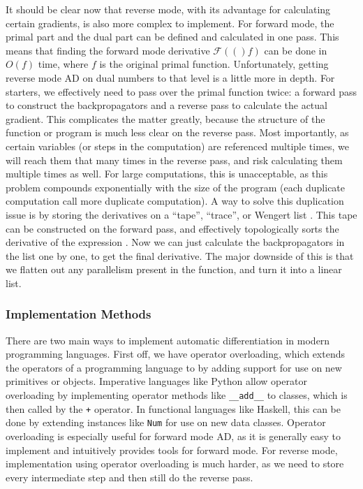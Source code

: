 \documentclass{article}
\newcommand{\fw}[1]{\mathcal{F}(#1)}
\begin{document}
            It should be clear now that reverse mode, with its advantage for calculating certain gradients, is also more complex to implement.
            For forward mode, the primal part and the dual part can be defined and calculated in one pass.
            This means that finding the forward mode derivative $\fw(f)$ can be done in $O(f)$ time, where $f$ is the original primal function.
            Unfortunately, getting reverse mode AD on dual numbers to that level is a little more in depth.
            For starters, we effectively need to pass over the primal function twice: a forward pass to construct the backpropagators and a reverse pass to calculate the actual gradient.
            This complicates the matter greatly, because the structure of the function or program is much less clear on the reverse pass.
            Most importantly, as certain variables (or steps in the computation) are referenced multiple times, we will reach them that many times in the reverse pass, and risk calculating them multiple times as well.
            For large computations, this is unacceptable, as this problem compounds exponentially with the size of the program (each duplicate computation call more duplicate computation).
            A way to solve this duplication issue is by storing the derivatives on a ``tape'', ``trace'', or Wengert list \cite{griewank2008evaluating}.
            This tape can be constructed on the forward pass, and effectively topologically sorts the derivative of the expression \cite{smeding2022efficient,krawiec2022provably}.
            Now we can just calculate the backpropagators in the list one by one, to get the final derivative.
            The major downside of this is that we flatten out any parallelism present in the function, and turn it into a linear list.

            \subsubsection{Implementation Methods}
                There are two main ways to implement automatic differentiation in modern programming languages.
                First off, we have operator overloading, which extends the operators of a programming language to by adding support for use on new primitives or objects.
                Imperative languages like Python allow operator overloading by implementing operator methods like \texttt{\_\_add\_\_} to classes, which is then called by the \texttt{+} operator.
                In functional languages like Haskell, this can be done by extending instances like \texttt{Num} for use on new data classes.
                Operator overloading is especially useful for forward mode AD, as it is generally easy to implement and intuitively provides tools for forward mode.
                For reverse mode, implementation using operator overloading is much harder, as we need to store every intermediate step and then still do the reverse pass.
                
\end{document}
